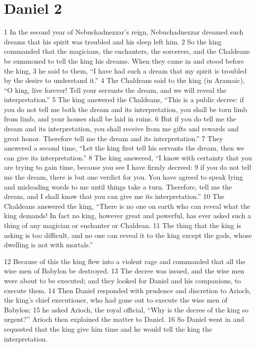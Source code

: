 \chapter{Daniel 2}
\label{ch:daniel2}

1 In the second year of Nebuchadnezzar's reign, Nebuchadnezzar dreamed such 
dreams that his spirit was troubled and his sleep left him. 2 So the king 
commanded that the magicians, the enchanters, the sorcerers, and the Chaldeans 
be summoned to tell the king his dreams. When they came in and stood before 
the king, 3 he said to them, ``I have had such a dream that my spirit is 
troubled by the desire to understand it.'' 4 The Chaldeans said to the king 
(in Aramaic), ``O king, live forever! Tell your servants the dream, and we will 
reveal the interpretation.'' 5 The king answered the Chaldeans, ``This is a 
public decree: if you do not tell me both the dream and its interpretation, you 
shall be torn limb from limb, and your houses shall be laid in ruins. 6 But if 
you do tell me the dream and its interpretation, you shall receive from me 
gifts and rewards and great honor. Therefore tell me the dream and its 
interpretation.'' 7 They answered a second time, ``Let the king first tell his 
servants the dream, then we can give its interpretation.'' 8 The king answered,
``I know with certainty that you are trying to gain time, because you see I 
have firmly decreed: 9 if you do not tell me the dream, there is but one 
verdict for you. You have agreed to speak lying and misleading words to me 
until things take a turn. Therefore, tell me the dream, and I shall know that 
you can give me its interpretation.'' 10 The Chaldeans answered the king, 
``There is no one on earth who can reveal what the king demands! In fact no 
king, however great and powerful, has ever asked such a thing of any magician 
or enchanter or Chaldean. 11 The thing that the king is asking is too difficult, 
and no one can reveal it to the king except the gods, whose dwelling is not 
with mortals.''

12 Because of this the king flew into a violent rage and commanded that all the 
wise men of Babylon be destroyed. 13 The decree was issued, and the wise men 
were about to be executed; and they looked for Daniel and his companions, to 
execute them. 14 Then Daniel responded with prudence and discretion to Arioch, 
the king's chief executioner, who had gone out to execute the wise men of 
Babylon; 15 he asked Arioch, the royal official, ``Why is the decree of the 
king so urgent?'' Arioch then explained the matter to Daniel. 16 So Daniel went 
in and requested that the king give him time and he would tell the king the 
interpretation.

